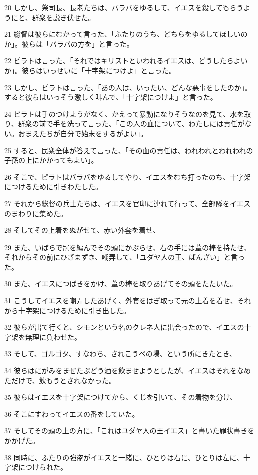 \par 20 しかし、祭司長、長老たちは、バラバをゆるして、イエスを殺してもらうようにと、群衆を説き伏せた。
\par 21 総督は彼らにむかって言った、「ふたりのうち、どちらをゆるしてほしいのか」。彼らは「バラバの方を」と言った。
\par 22 ピラトは言った、「それではキリストといわれるイエスは、どうしたらよいか」。彼らはいっせいに「十字架につけよ」と言った。
\par 23 しかし、ピラトは言った、「あの人は、いったい、どんな悪事をしたのか」。すると彼らはいっそう激しく叫んで、「十字架につけよ」と言った。
\par 24 ピラトは手のつけようがなく、かえって暴動になりそうなのを見て、水を取り、群衆の前で手を洗って言った、「この人の血について、わたしには責任がない。おまえたちが自分で始末をするがよい」。
\par 25 すると、民衆全体が答えて言った、「その血の責任は、われわれとわれわれの子孫の上にかかってもよい」。
\par 26 そこで、ピラトはバラバをゆるしてやり、イエスをむち打ったのち、十字架につけるために引きわたした。
\par 27 それから総督の兵士たちは、イエスを官邸に連れて行って、全部隊をイエスのまわりに集めた。
\par 28 そしてその上着をぬがせて、赤い外套を着せ、
\par 29 また、いばらで冠を編んでその頭にかぶらせ、右の手には葦の棒を持たせ、それからその前にひざまずき、嘲弄して、「ユダヤ人の王、ばんざい」と言った。
\par 30 また、イエスにつばきをかけ、葦の棒を取りあげてその頭をたたいた。
\par 31 こうしてイエスを嘲弄したあげく、外套をはぎ取って元の上着を着せ、それから十字架につけるために引き出した。
\par 32 彼らが出て行くと、シモンという名のクレネ人に出会ったので、イエスの十字架を無理に負わせた。
\par 33 そして、ゴルゴタ、すなわち、されこうべの場、という所にきたとき、
\par 34 彼らはにがみをまぜたぶどう酒を飲ませようとしたが、イエスはそれをなめただけで、飲もうとされなかった。
\par 35 彼らはイエスを十字架につけてから、くじを引いて、その着物を分け、
\par 36 そこにすわってイエスの番をしていた。
\par 37 そしてその頭の上の方に、「これはユダヤ人の王イエス」と書いた罪状書きをかかげた。
\par 38 同時に、ふたりの強盗がイエスと一緒に、ひとりは右に、ひとりは左に、十字架につけられた。
